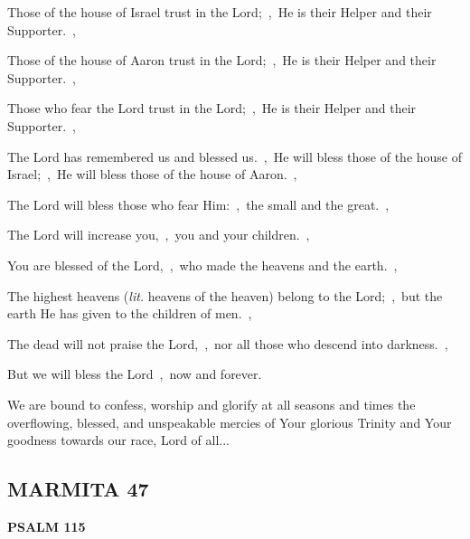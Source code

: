 \documentclass[12pt,twoside,a5paper]{article}
\newcommand{\marmita}[1]{\subsection*{MARMITA {#1}}}
\newcommand{\psalm}[1]{\textbf{PSALM {#1}}\nopagebreak}
\newcommand{\slota}[1]{\liturgicalhint{Slota.} #1}
\newcommand{\translationliteral}[1]{\emph{lit.} #1}
\begin{document}
\begin{normalparskip}
  Those of the house of Israel trust in the Lord;~\sep\ He is their Helper and their Supporter.~\sep

  Those of the house of Aaron trust in the Lord;~\sep\ He is their Helper and their Supporter.~\sep

  Those who fear the Lord trust in the Lord;~\sep\ He is their Helper and their Supporter.~\sep

  The Lord has remembered us and blessed us.~\sep\ He will bless those of the house of Israel;~\sep\ He will bless those of the house of Aaron.~\sep

  The Lord will bless those who fear Him:~\sep\ the small and the great.~\sep

  The Lord will increase you,~\sep\ you and your children.~\sep

  You are blessed of the Lord,~\sep\ who made the heavens and the earth.~\sep

  The highest heavens (\translationliteral{heavens of the heaven}) belong to the Lord;~\sep\ but the earth He has given to the children of men.~\sep

  The dead will not praise the Lord,~\sep\ nor all those who descend into darkness.~\sep

  But we will bless the Lord~\sep\ now and forever.
\end{normalparskip}

\slota{We are bound to confess, worship and glorify at all seasons and times the overflowing, blessed, and unspeakable mercies of Your glorious Trinity and Your goodness towards our race, Lord of all...}

\marmita{47}

\psalm{115}
\end{document}
